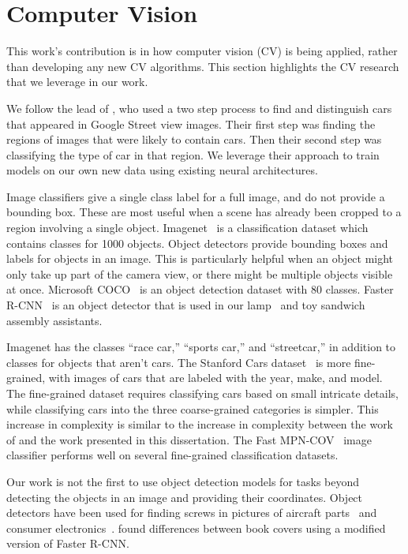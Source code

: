 \section{Computer Vision}

This work's contribution is in how computer vision (CV) is being applied, rather
than developing any new CV algorithms.
This section highlights the CV research that we leverage in our work.

We follow the lead of \citet{gebru2017finegrained}, who used a two step
process to find and distinguish cars that appeared in Google Street view
images.
Their first step was finding the
regions of images that were likely to contain cars. Then their second step was
classifying the type of car in that region.
We leverage their approach to train models on our own new
data using existing neural architectures.

Image classifiers give a single class label for a full image, and do not provide
a bounding box. These are most useful when a scene has already been cropped to a
region involving a single object. Imagenet~\cite{ImageNet_VSS09} is a
classification dataset which contains classes for 1000 objects. Object
detectors provide bounding boxes and labels for objects in an image. This is
particularly helpful
when an object might only take up part of the camera view, or there might be
multiple objects visible
at once. Microsoft COCO~\cite{coco} is an object detection dataset with 80
classes.
Faster R-CNN~\cite{frcnn} is an object detector that is used in our
lamp~\cite{lamp} and toy sandwich~\cite{sandwich} assembly assistants.

Imagenet has the classes ``race car,'' ``sports car,'' and ``streetcar,''
in addition to classes for objects that aren't cars.
The Stanford Cars dataset~\cite{KrauseStarkDengFei-Fei_3DRR2013} is more
fine-grained, with images of cars that are labeled with the year, make, and
model.
The fine-grained dataset requires classifying cars based on small intricate
details, while classifying cars into the three coarse-grained categories is
simpler.
This increase in complexity is similar to the increase in complexity between
the work of \citet{chen2017} and the work presented in this dissertation.
The Fast MPN-COV~\cite{Li_2018_CVPR} image classifier performs
well on several fine-grained classification datasets.

Our work is not the first to use object detection models for tasks beyond
detecting the objects in an image and providing their coordinates.
Object detectors have been used for finding screws in pictures of aircraft
parts~\cite{visapp19} and consumer electronics~\cite{FOO2021666}.
\citet{wu2018spot} found differences between book covers using a modified
version of Faster R-CNN.

